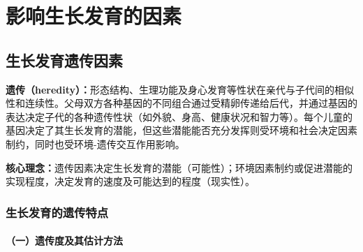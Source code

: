\chapter{影响生长发育的因素}
\setcounter{chapter}{6}

\section{生长发育遗传因素}

\begin{defbox}
\textbf{遗传（heredity）：}形态结构、生理功能及身心发育等性状在亲代与子代间的相似性和连续性。父母双方各种基因的不同组合通过受精卵传递给后代，并通过基因的表达决定子代的各种遗传性状（如外貌、身高、健康状况和智力等）。每个儿童的基因决定了其生长发育的潜能，但这些潜能能否充分发挥则受环境和社会决定因素制约，同时也受环境-遗传交互作用影响。

\textbf{核心理念：}遗传因素决定生长发育的潜能（可能性）；环境因素制约或促进潜能的实现程度，决定发育的速度及可能达到的程度（现实性）。
\end{defbox}

\subsection{生长发育的遗传特点}

\subsubsection{（一）遗传度及其估计方法}

